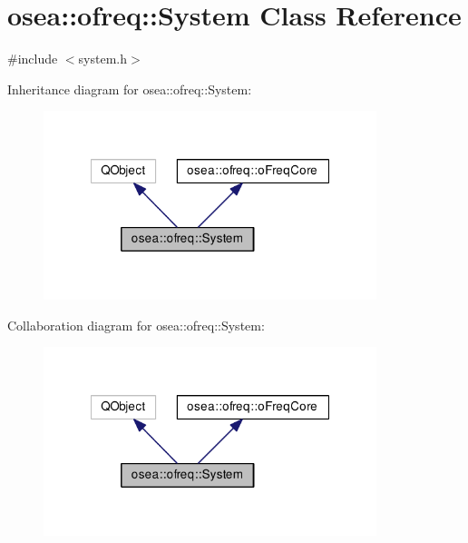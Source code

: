 \hypertarget{classosea_1_1ofreq_1_1_system}{\section{osea\-:\-:ofreq\-:\-:System Class Reference}
\label{classosea_1_1ofreq_1_1_system}
}


{\ttfamily \#include $<$system.\-h$>$}



Inheritance diagram for osea\-:\-:ofreq\-:\-:System\-:
\nopagebreak
\begin{figure}[H]
\begin{center}
\leavevmode
\includegraphics[width=275pt]{classosea_1_1ofreq_1_1_system__inherit__graph}
\end{center}
\end{figure}


Collaboration diagram for osea\-:\-:ofreq\-:\-:System\-:
\nopagebreak
\begin{figure}[H]
\begin{center}
\leavevmode
\includegraphics[width=275pt]{classosea_1_1ofreq_1_1_system__coll__graph}
\end{center}
\end{figure}
